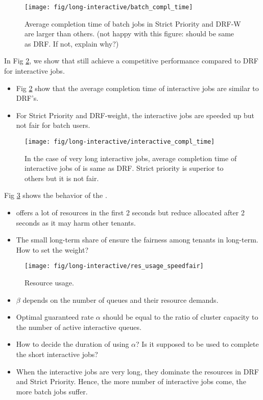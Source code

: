 \begin{figure}
	\centering
	\texttt{[image: fig/long-interactive/batch\_compl\_time]}
	\caption{Average completion time of batch jobs in Strict Priority and DRF-W are larger than others. (not happy with this figure: \name should be same as DRF. If not, explain why?)}
	\label{fig:long_batch_compl_time}
\end{figure}

In Fig \ref{fig:long_interactive_compl_time}, we show that \name still achieve a competitive performance compared to DRF for interactive jobs.
\begin{itemize}
	\item Fig \ref{fig:long_interactive_compl_time} show that the average completion time of interactive jobs are similar to DRF's.
	\item For Strict Priority and DRF-weight, the interactive jobs are speeded up but not fair for batch users.
\end{itemize}  


\begin{figure}
	\centering
	\texttt{[image: fig/long-interactive/interactive\_compl\_time]}
	\caption{In the case of very long interactive jobs, average completion time of interactive jobs of \name is same as DRF. Strict priority is superior to others but it is not fair.}
	\label{fig:long_interactive_compl_time}
\end{figure}



Fig \ref{fig:long_res_usage_speedfair} shows the behavior of the \name. 
\begin{itemize}
	\item \name offers a lot of resources in the first 2 seconds but reduce allocated after 2 seconds as it may harm other tenants.
	\item The small long-term share of \name ensure the fairness among tenants in long-term. How to set the weight?
\end{itemize}


\begin{figure}
	\centering
	\texttt{[image: fig/long-interactive/res\_usage\_speedfair]}
	\caption{Resource usage.}
	\label{fig:long_res_usage_speedfair}
\end{figure}

%

\begin{itemize}
	\item $\beta$ depends on the number of queues and their resource demands. 
	\item Optimal guaranteed rate $\alpha$ should be equal to the ratio of cluster capacity to the number of active interactive queues.
	\item How to decide the duration of using $\alpha$? Is it supposed to be used to complete the short interactive jobs?
	\item When the interactive jobs are very long, they dominate the resources in DRF and Strict Priority. Hence, the more number of interactive jobs come, the more batch jobs suffer.
\end{itemize}

